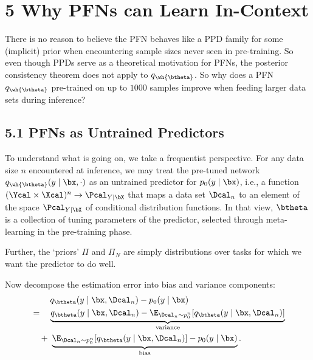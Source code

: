 \documentclass[aspectratio=169,10pt]{beamer}
\newcommand{\currentheading}{\ifx\insertsubsection\empty\insertsection\else\insertsubsection\fi}
\begin{document}
\section{5 Why PFNs can Learn In-Context}

\begin{frame}{\currentheading}
There is no reason to believe the PFN behaves like a PPD family for some (implicit) prior when encountering sample sizes never seen in pre-training. So even though PPDs serve as a theoretical motivation for PFNs, the posterior consistency theorem does not apply to $q_{\wh{\btheta}}$. So why does a PFN $q_{\wh{\btheta}}$ pre-trained on up to $1000$ samples improve when feeding larger data sets during inference?
\end{frame}

\subsection{5.1 PFNs as Untrained Predictors}

\begin{frame}{\currentheading}
To understand what is going on, we take a frequentist perspective. For any data size $n$ encountered at inference, we may treat the pre-tuned network $q_{\wh{\btheta}}(y \mid \bx, \cdot)$ as an untrained predictor for $p_0(y \mid \bx)$, i.e., a function $(\Ycal \times \Xcal)^n \to \Pcal_{Y \mid \bX}$ that maps a data set $\Dcal_n$ to an element of the space $\Pcal_{Y \mid \bX}$ of conditional distribution functions. In that view, $\btheta$ is a collection of tuning parameters of the predictor, selected through meta-learning in the pre-training phase.

Further, the `priors' $\Pi$ and $\Pi_N$ are simply distributions over tasks for which we want the predictor to do well.
\end{frame}

\begin{frame}{\currentheading}
Now decompose the estimation error into bias and variance components:
\begin{align*}
	 &\quad \quad \; q_{\btheta}(y \mid \bx, \Dcal_n)  - p_0(y \mid \bx) \\
     &=\quad  \underbrace{q_{\btheta}(y \mid \bx, \Dcal_n) - \E_{\Dcal_n \sim p_0^n}[q_{\btheta}(y \mid \bx, \Dcal_n)]}_{\text{variance}}  \\
     &\quad +\; \underbrace{\E_{\Dcal_n \sim p_0^n}[q_{\btheta}(y \mid \bx, \Dcal_n)]   - p_0(y \mid \bx)}_{\text{bias}}.
\end{align*}
\end{frame}
\end{document}
